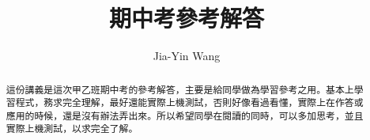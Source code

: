 \documentclass[12pt,a4paper]{article}
\begin{document}
\title{期中考參考解答}
\author{Jia-Yin Wang}
\maketitle

\begin{abstract}
這份講義是這次甲乙班期中考的參考解答，主要是給同學做為學習參考之用。基本上學習程式，務求完全理解，最好還能實際上機測試，否則好像看過看懂，實際上在作答或應用的時候，還是沒有辦法弄出來。所以希望同學在閱讀的同時，可以多加思考，並且實際上機測試，以求完全了解。
\end{abstract}



















\end{document}
